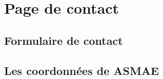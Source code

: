 \section{Page de contact}

\subsection{Formulaire de contact}

\subsection{Les coordonnées de ASMAE}
